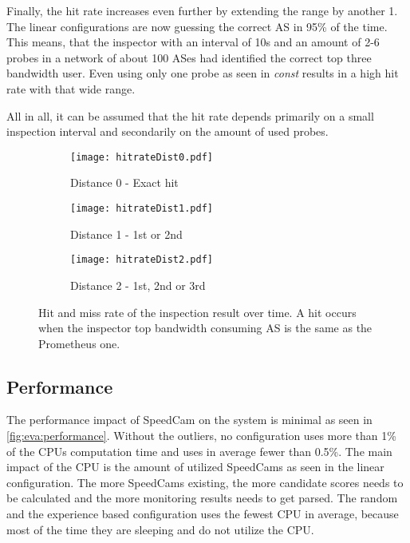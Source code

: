 \documentclass[thesis.tex]{subfiles}
\begin{document}
Finally, the hit rate increases even further by extending the range by another 1. The linear configurations are now guessing the correct AS in 95\% of the time. This means, that the inspector with an interval of 10s and an amount of 2-6 probes in a network of about 100 ASes had identified the correct top three bandwidth user. Even using only one probe as seen in \textit{const} results in a high hit rate with that wide range.

All in all, it can be assumed that the hit rate depends primarily on a small inspection interval and secondarily on the amount of used probes.
\begin{figure}[!h]
	\centering
	\begin{subfigure}{0.9\linewidth}
		\centering
		\texttt{[image: hitrateDist0.pdf]}
		\caption{Distance 0 - Exact hit}
		\label{fig:eva:hitrate:0}
	\end{subfigure}
	\hfill
	\begin{subfigure}{0.9\linewidth}
		\centering
		\texttt{[image: hitrateDist1.pdf]}
		\caption{Distance 1 - 1st or 2nd}
		\label{fig:eva:hitrate:1}
	\end{subfigure}
	\hfill	
	\begin{subfigure}{0.9\linewidth}
		\centering
		\texttt{[image: hitrateDist2.pdf]}
		\caption{Distance 2 - 1st, 2nd or 3rd}
		\label{fig:eva:hitrate:2}
	\end{subfigure}
	\caption{Hit and miss rate of the inspection result over time. A hit occurs when the inspector top bandwidth consuming AS is the same as the Prometheus one.}
	\label{fig:eva:hitrate}
\end{figure}


\subsection{Performance} \label{sec:eva:performance}

The performance impact of SpeedCam on the system is minimal as seen in \autoref{fig:eva:performance}. Without the outliers, no configuration uses more than 1\% of the CPUs computation time and uses in average fewer than 0.5\%. The main impact of the CPU is the amount of utilized SpeedCams as seen in the linear configuration. The more SpeedCams existing, the more candidate scores needs to be calculated and the more monitoring results needs to get parsed. The random and the experience based configuration uses the fewest CPU in average, because most of the time they are sleeping and do not utilize the CPU.
\end{document}
